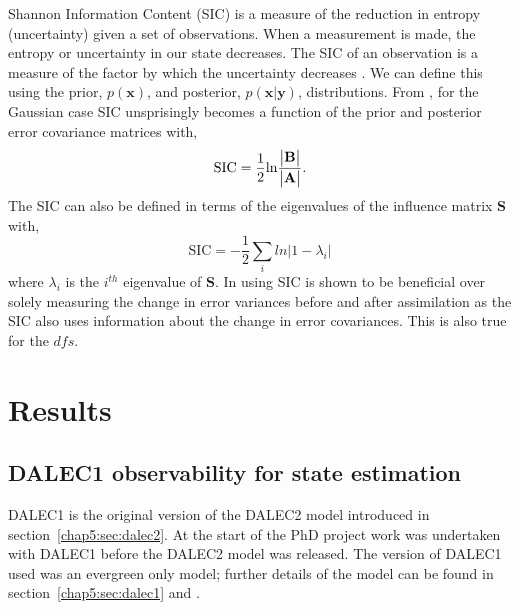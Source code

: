 Shannon Information Content (SIC) is a measure of the reduction in entropy (uncertainty) given a set of observations. When a measurement is made, the entropy or uncertainty in our state decreases. The SIC of an observation is a measure of the factor by which the uncertainty decreases \citep{cover1991elements}. We can define this using the prior, $p(\textbf{x})$, and posterior, $p(\textbf{x}|\textbf{y})$, distributions. From \citet{rodgers2000inverse}, for the Gaussian case SIC unsprisingly becomes a function of the prior and posterior error covariance matrices with,
\begin{equation}
\text{SIC}=\frac{1}{2}\text{ln}\frac{\begin{vmatrix} \bf{B} \end{vmatrix}}{\begin{vmatrix} \bf{A} \end{vmatrix}}. \label{chap5:eqn:sic}
\end{equation}
The SIC can also be defined in terms of the eigenvalues of the influence matrix $\textbf{S}$ with,
\begin{equation}
\text{SIC} = -\frac{1}{2} \sum_{i} ln | 1 - \lambda_{i} |
\end{equation}
where $\lambda_{i}$ is the $i^{th}$ eigenvalue of $\textbf{S}$. In \citet{eyre1990information} using SIC is shown to be beneficial over solely measuring the change in error variances before and after assimilation as the SIC also uses information about the change in error covariances. This is also true for the $dfs$.   

\section{Results}

\subsection{DALEC1 observability for state estimation} \label{chap5:sec:D1observability}

DALEC1 is the original version of the DALEC2 model introduced in section~\ref{chap5:sec:dalec2}. At the start of the PhD project work was undertaken with DALEC1 before the DALEC2 model was released. The version of DALEC1 used was an evergreen only model; further details of the model can be found in section~\ref{chap5:sec:dalec1} and \citet{williams2005improved}. 

